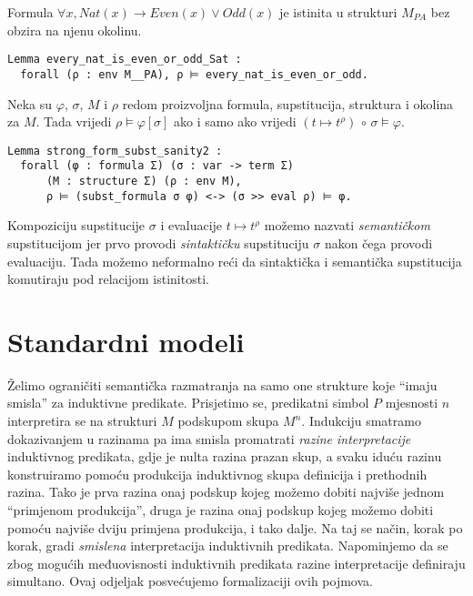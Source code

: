 \begin{example}
  Formula \(\forall x, \mathit{Nat}(x) \rightarrow \mathit{Even}(x) \lor \mathit{Odd}(x)\) je istinita u strukturi \(M_{\mathit{PA}}\)
  bez obzira na njenu okolinu.
\begin{verbatim}
Lemma every_nat_is_even_or_odd_Sat :
  forall (ρ : env M__PA), ρ ⊨ every_nat_is_even_or_odd.
\end{verbatim}
\end{example}

\begin{lemma}
  Neka su \(\varphi\), \(\sigma\), \(M\) i \(\rho\) redom
  proizvoljna formula, supstitucija, struktura i okolina za \(M\).
  Tada vrijedi \(\rho \vDash \varphi[\sigma]\) ako i samo ako vrijedi \( (t \mapsto t^{\rho}) \, \circ \, \sigma \vDash \varphi\).
\begin{verbatim}
Lemma strong_form_subst_sanity2 :
  forall (φ : formula Σ) (σ : var -> term Σ)
      (M : structure Σ) (ρ : env M),
      ρ ⊨ (subst_formula σ φ) <-> (σ >> eval ρ) ⊨ φ.
\end{verbatim}
  \noindent Kompoziciju supstitucije \(\sigma\) i evaluacije \(t \mapsto t^{\rho}\)
  možemo nazvati \textit{semantičkom} supstitucijom
  jer prvo provodi \textit{sintaktičku} supstituciju \(\sigma\) nakon čega provodi evaluaciju.
  Tada možemo neformalno reći da sintaktička i semantička supstitucija
  komutiraju pod relacijom istinitosti.
\end{lemma}

\section{Standardni modeli}\label{sec:standardni-modeli}
Želimo ograničiti semantička razmatranja na samo one strukture koje \enquote{imaju smisla} za induktivne predikate.
Prisjetimo se, predikatni simbol \(P\) mjesnosti \(n\) interpretira se na strukturi \(M\)  podskupom skupa \(M^{n}\).
Indukciju smatramo dokazivanjem \textup{u razinama} pa ima smisla promatrati \textit{razine interpretacije} induktivnog predikata,
gdje je nulta razina prazan skup,
a svaku iduću razinu konstruiramo pomoću produkcija induktivnog skupa definicija i prethodnih razina.
Tako je prva razina onaj podskup kojeg možemo dobiti najviše jednom \enquote{primjenom produkcija},
druga je razina onaj podskup kojeg možemo dobiti pomoću najviše dviju primjena produkcija, i tako dalje.
Na taj se način, korak po korak, gradi \textit{smislena} interpretacija induktivnih predikata.
Napominjemo da se zbog mogućih međuovisnosti induktivnih predikata razine interpretacije definiraju simultano.
Ovaj odjeljak posvećujemo formalizaciji ovih pojmova.

